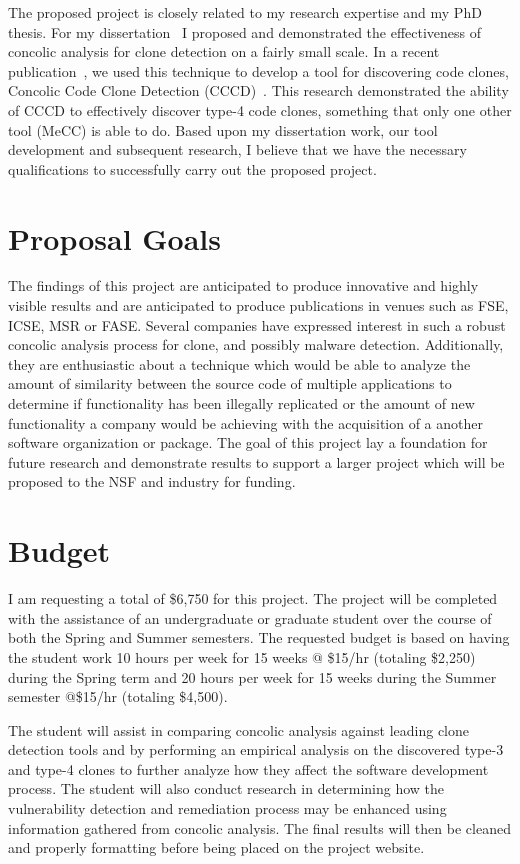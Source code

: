 \documentclass{article}
\begin{document}
The proposed project is closely related to my research expertise and my PhD thesis. For my dissertation~\cite{Dan123} I proposed and demonstrated the effectiveness of concolic analysis for clone detection on a fairly small scale. In a recent publication~\cite{wcre2013}, we used this technique to develop a tool for discovering code clones, Concolic Code Clone Detection (CCCD)~\cite{wcre2013}. This research demonstrated the ability of CCCD to effectively discover type-4 code clones, something that only one other tool (MeCC) is able to do. Based upon my dissertation work, our tool development and subsequent research, I believe that we have the necessary qualifications to successfully carry out the proposed project.

\section{Proposal Goals} %

The findings of this project are anticipated to produce innovative and highly visible results and are anticipated to produce publications in venues such as FSE, ICSE, MSR or FASE. Several companies have expressed interest in such a robust concolic analysis process for clone, and possibly malware detection. Additionally, they are enthusiastic about a technique which would be able to analyze the amount of similarity between the source code of multiple applications to determine if functionality has been illegally replicated or the amount of new functionality a company would be achieving with the acquisition of a another software organization or package. The goal of this project lay a foundation for future research and demonstrate results to support a larger project which will be proposed to the NSF and industry for funding.

\section{Budget}

I am requesting a total of \$6,750 for this project. The project will be completed with the assistance of an undergraduate or graduate student over the course of both the Spring and Summer semesters. The requested budget is based on having the student work 10 hours per week for 15 weeks @ \$15/hr (totaling \$2,250) during the Spring term and 20 hours per week for 15 weeks during the Summer semester @\$15/hr (totaling \$4,500).

The student will assist in comparing concolic analysis against leading clone detection tools and by performing an empirical analysis on the discovered type-3 and type-4 clones to further analyze how they affect the software development process. The student will also conduct research in determining how the vulnerability detection and remediation process may be enhanced using information gathered from concolic analysis. The final results will then be cleaned and properly formatting before being placed on the project website.

%


\end{document}
